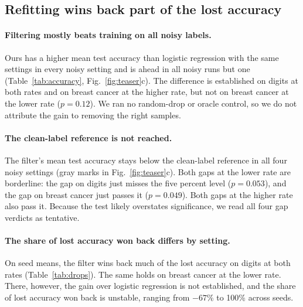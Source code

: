 \subsection{Refitting wins back part of the lost accuracy}\label{sec:results_accuracy}



\paragraph{Filtering mostly beats training on all noisy labels.}
Ours has a higher mean test accuracy than logistic regression with the same settings in every noisy setting and is ahead in all noisy runs but one (Table~\ref{tab:accuracy}, Fig.~\ref{fig:teaser}c). The difference is established on digits at both rates and on breast cancer at the higher rate, but not on breast cancer at the lower rate ($p = 0.12$). We ran no random-drop or oracle control, so we do not attribute the gain to removing the right samples.

\paragraph{The clean-label reference is not reached.}
The filter's mean test accuracy stays below the clean-label reference in all four noisy settings (gray marks in Fig.~\ref{fig:teaser}c). Both gaps at the lower rate are borderline: the gap on digits just misses the five percent level ($p = 0.053$), and the gap on breast cancer just passes it ($p = 0.049$). Both gaps at the higher rate also pass it. Because the test likely overstates significance, we read all four gap verdicts as tentative.

\paragraph{The share of lost accuracy won back differs by setting.}
On seed means, the filter wins back much of the lost accuracy on digits at both rates (Table~\ref{tab:drops}). The same holds on breast cancer at the lower rate. There, however, the gain over logistic regression is not established, and the share of lost accuracy won back is unstable, ranging from $-67$\% to 100\% across seeds.

